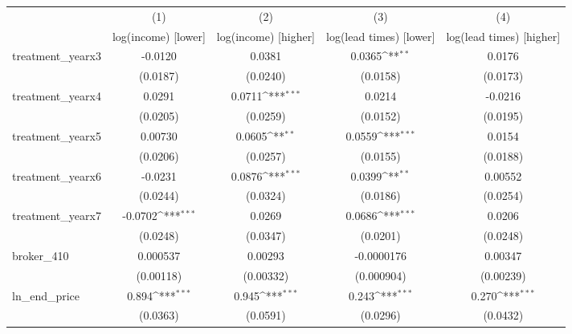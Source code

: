 {
\def\sym#1{\ifmmode^{#1}\else\(^{#1}\)\fi}
\begin{tabular}{l*{4}{c}}
\toprule
            &\multicolumn{1}{c}{(1)}&\multicolumn{1}{c}{(2)}&\multicolumn{1}{c}{(3)}&\multicolumn{1}{c}{(4)}\\
            &\multicolumn{1}{c}{log(income) [lower]}&\multicolumn{1}{c}{log(income) [higher]}&\multicolumn{1}{c}{log(lead times) [lower]}&\multicolumn{1}{c}{log(lead times) [higher]}\\
\midrule
treatment\_yearx3&     -0.0120         &      0.0381         &      0.0365\sym{**} &      0.0176         \\
            &    (0.0187)         &    (0.0240)         &    (0.0158)         &    (0.0173)         \\
\addlinespace
treatment\_yearx4&      0.0291         &      0.0711\sym{***}&      0.0214         &     -0.0216         \\
            &    (0.0205)         &    (0.0259)         &    (0.0152)         &    (0.0195)         \\
\addlinespace
treatment\_yearx5&     0.00730         &      0.0605\sym{**} &      0.0559\sym{***}&      0.0154         \\
            &    (0.0206)         &    (0.0257)         &    (0.0155)         &    (0.0188)         \\
\addlinespace
treatment\_yearx6&     -0.0231         &      0.0876\sym{***}&      0.0399\sym{**} &     0.00552         \\
            &    (0.0244)         &    (0.0324)         &    (0.0186)         &    (0.0254)         \\
\addlinespace
treatment\_yearx7&     -0.0702\sym{***}&      0.0269         &      0.0686\sym{***}&      0.0206         \\
            &    (0.0248)         &    (0.0347)         &    (0.0201)         &    (0.0248)         \\
\addlinespace
broker\_410  &    0.000537         &     0.00293         &  -0.0000176         &     0.00347         \\
            &   (0.00118)         &   (0.00332)         &  (0.000904)         &   (0.00239)         \\
\addlinespace
ln\_end\_price&       0.894\sym{***}&       0.945\sym{***}&       0.243\sym{***}&       0.270\sym{***}\\
            &    (0.0363)         &    (0.0591)         &    (0.0296)         &    (0.0432)         \\

\end{tabular}}
